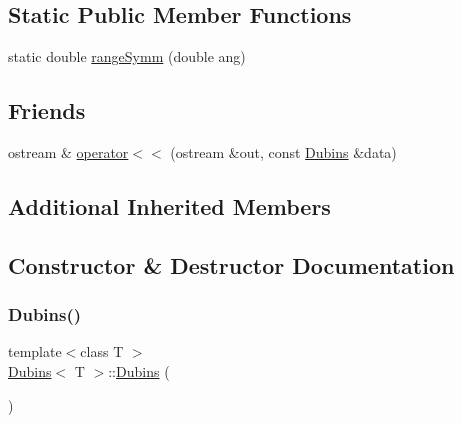 \subsection*{Static Public Member Functions}
\begin{DoxyCompactItemize}
\item 
static double \mbox{\hyperlink{class_dubins_a1f80a03865231b60841bc8ec7623c04f}{range\+Symm}} (double ang)
\end{DoxyCompactItemize}
\subsection*{Friends}
\begin{DoxyCompactItemize}
\item 
ostream \& \mbox{\hyperlink{class_dubins_a0178baccb8eb26af22a5eb717f394c8c}{operator$<$$<$}} (ostream \&out, const \mbox{\hyperlink{class_dubins}{Dubins}} \&data)
\end{DoxyCompactItemize}
\subsection*{Additional Inherited Members}


\subsection{Constructor \& Destructor Documentation}
\mbox{\label{class_dubins_acc45a9db5f20150b58d4fc36ad1548fa}} 
\subsubsection{\texorpdfstring{Dubins()}{Dubins()}\hspace{0.1cm}{\footnotesize\ttfamily [1/4]}}
{\footnotesize\ttfamily template$<$class T $>$ \\
\mbox{\hyperlink{class_dubins}{Dubins}}$<$ T $>$\+::\mbox{\hyperlink{class_dubins}{Dubins}} (\begin{DoxyParamCaption}{ }\end{DoxyParamCaption})\hspace{0.3cm}{\ttfamily [inline]}}

\mbox{\label{class_dubins_aa967d7d3009612ab99ac0b8e7ec33c83}} 
